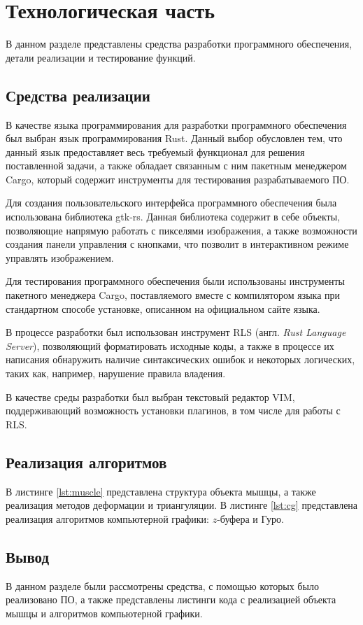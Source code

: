 \chapter{Технологическая часть}

В данном разделе представлены средства разработки программного обеспечения, детали реализации и тестирование функций.

\section{Средства реализации}

В качестве языка программирования для разработки программного обеспечения был выбран язык программирования Rust\cite{rust}. Данный выбор обусловлен тем, что данный язык предоставляет весь требуемый функционал для решения поставленной задачи, а также обладает связанным с ним пакетным менеджером Cargo\cite{cargo}, который содержит инструменты для тестирования разрабатываемого ПО\cite{rusttest}.

Для создания пользовательского интерфейса программного обеспечения была использована библиотека gtk-rs\cite{gtk-rs}. Данная библиотека содержит в себе объекты, позволяющие напрямую работать с пикселями изображения, а также возможности создания панели управления с кнопками, что позволит в интерактивном режиме управлять изображением.

Для тестирования программного обеспечения были использованы инструменты пакетного менеджера Cargo\cite{cargo}, поставляемого вместе с компилятором языка при стандартном способе установке, описанном на официальном сайте языка\cite{rust}. 

В процессе разработки был использован инструмент RLS\cite{rls} (англ. \textit{Rust Language Server}), позволяющий форматировать исходные коды, а также в процессе их написания обнаружить наличие синтаксических ошибок и некоторых логических, таких как, например, нарушение правила владения\cite{rust-learn}.

В качестве среды разработки был выбран текстовый редактор VIM\cite{vim}, поддерживающий возможность установки плагинов\cite{vim-plugins}, в том числе для работы с RLS\cite{rls}.

\section{Реализация алгоритмов}

В листинге \ref{lst:muscle} представлена структура объекта мышцы, а также реализация методов деформации и триангуляции. В листинге \ref{lst:cg} представлена реализация алгоритмов компьютерной графики: $z$-буфера и Гуро.


\section*{Вывод}

В данном разделе были рассмотрены средства, с помощью которых было реализовано ПО, а также представлены листинги кода с реализацией объекта мышцы и алгоритмов компьютерной графики.
